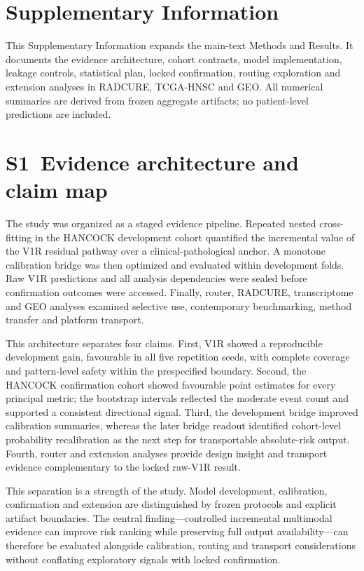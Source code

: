 \clearpage
\section*{Supplementary Information}

This Supplementary Information expands the main-text Methods and Results. It documents the evidence architecture, cohort contracts, model implementation, leakage controls, statistical plan, locked confirmation, routing exploration and extension analyses in RADCURE, TCGA-HNSC and GEO. All numerical summaries are derived from frozen aggregate artifacts; no patient-level predictions are included.

\setcounter{figure}{0}
\setcounter{table}{0}
\renewcommand{\thefigure}{S\arabic{figure}}
\renewcommand{\thetable}{S\arabic{table}}
\setlength{\LTcapwidth}{\textwidth}
\renewcommand{\arraystretch}{1.08}

\section*{S1~Evidence architecture and claim map}
The study was organized as a staged evidence pipeline. Repeated nested cross-fitting in the HANCOCK development cohort quantified the incremental value of the V1R residual pathway over a clinical-pathological anchor. A monotone calibration bridge was then optimized and evaluated within development folds. Raw V1R predictions and all analysis dependencies were sealed before confirmation outcomes were accessed. Finally, router, RADCURE, transcriptome and GEO analyses examined selective use, contemporary benchmarking, method transfer and platform transport.

This architecture separates four claims. First, V1R showed a reproducible development gain, favourable in all five repetition seeds, with complete coverage and pattern-level safety within the prespecified boundary. Second, the HANCOCK confirmation cohort showed favourable point estimates for every principal metric; the bootstrap intervals reflected the moderate event count and supported a consistent directional signal. Third, the development bridge improved calibration summaries, whereas the later bridge readout identified cohort-level probability recalibration as the next step for transportable absolute-risk output. Fourth, router and extension analyses provide design insight and transport evidence complementary to the locked raw-V1R result.

This separation is a strength of the study. Model development, calibration, confirmation and extension are distinguished by frozen protocols and explicit artifact boundaries. The central finding---controlled incremental multimodal evidence can improve risk ranking while preserving full output availability---can therefore be evaluated alongside calibration, routing and transport considerations without conflating exploratory signals with locked confirmation.

